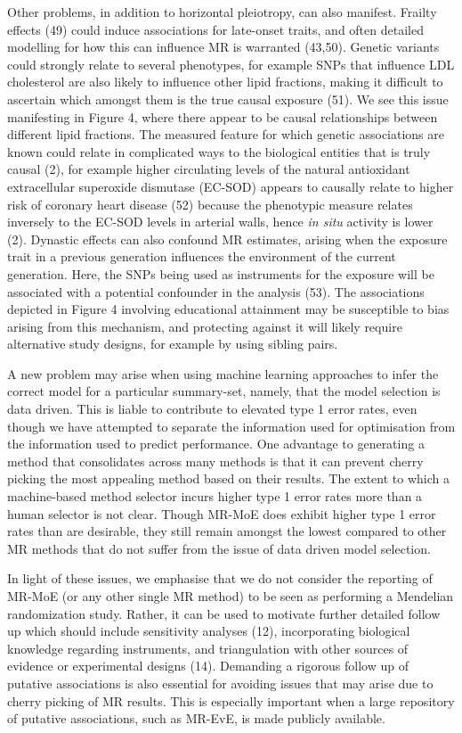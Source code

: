 \documentclass[]{article}
\begin{document}
Other problems, in addition to horizontal pleiotropy, can also manifest.
Frailty effects (49) could induce associations for late-onset traits,
and often detailed modelling for how this can influence MR is warranted
(43,50). Genetic variants could strongly relate to several phenotypes,
for example SNPs that influence LDL cholesterol are also likely to
influence other lipid fractions, making it difficult to ascertain which
amongst them is the true causal exposure (51). We see this issue
manifesting in Figure 4, where there appear to be causal relationships
between different lipid fractions. The measured feature for which
genetic associations are known could relate in complicated ways to the
biological entities that is truly causal (2), for example higher
circulating levels of the natural antioxidant extracellular superoxide
dismutase (EC-SOD) appears to causally relate to higher risk of coronary
heart disease (52) because the phenotypic measure relates inversely to
the EC-SOD levels in arterial walls, hence \emph{in situ} activity is
lower (2). Dynastic effects can also confound MR estimates, arising when
the exposure trait in a previous generation influences the environment
of the current generation. Here, the SNPs being used as instruments for
the exposure will be associated with a potential confounder in the
analysis (53). The associations depicted in Figure 4 involving
educational attainment may be susceptible to bias arising from this
mechanism, and protecting against it will likely require alternative
study designs, for example by using sibling pairs.

A new problem may arise when using machine learning approaches to infer
the correct model for a particular summary-set, namely, that the model
selection is data driven. This is liable to contribute to elevated type
1 error rates, even though we have attempted to separate the information
used for optimisation from the information used to predict performance.
One advantage to generating a method that consolidates across many
methods is that it can prevent cherry picking the most appealing method
based on their results. The extent to which a machine-based method
selector incurs higher type 1 error rates more than a human selector is
not clear. Though MR-MoE does exhibit higher type 1 error rates than are
desirable, they still remain amongst the lowest compared to other MR
methods that do not suffer from the issue of data driven model
selection.

In light of these issues, we emphasise that we do not consider the
reporting of MR-MoE (or any other single MR method) to be seen as
performing a Mendelian randomization study. Rather, it can be used to
motivate further detailed follow up which should include sensitivity
analyses (12), incorporating biological knowledge regarding instruments,
and triangulation with other sources of evidence or experimental designs
(14). Demanding a rigorous follow up of putative associations is also
essential for avoiding issues that may arise due to cherry picking of MR
results. This is especially important when a large repository of
putative associations, such as MR-EvE, is made publicly available.
\end{document}
